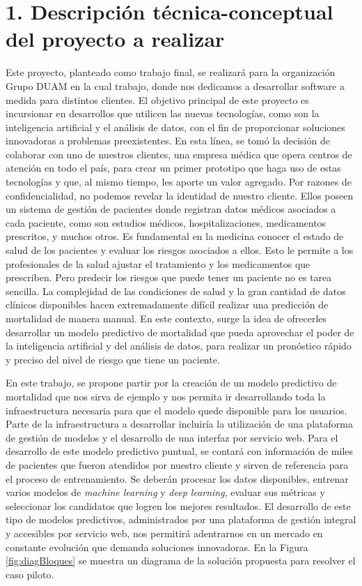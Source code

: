 \documentclass[
11pt, %
]{charter}
\begin{document}
\section{1. Descripción técnica-conceptual del proyecto a realizar}
\label{sec:descripcion}

Este proyecto, planteado como trabajo final, se realizará para la organización Grupo DUAM en la cual trabajo, donde nos dedicamos a desarrollar software a medida para distintos clientes.
El objetivo principal de este proyecto es incursionar en desarrollos que utilicen las nuevas tecnologías, como son la inteligencia artificial y el análisis de datos, con el fin de proporcionar soluciones innovadoras a problemas preexistentes.
En esta línea, se tomó la decisión de colaborar con uno de nuestros clientes, una empresa médica que opera centros de atención en todo el país, para crear un primer prototipo que haga uso de estas tecnologías y que, al mismo tiempo, les aporte un valor agregado. Por razones de confidencialidad, no podemos revelar la identidad de nuestro cliente. Ellos poseen un sistema de gestión de pacientes donde registran datos médicos asociados a cada paciente, como son estudios médicos, hospitalizaciones, medicamentos prescritos, y muchos otros. Es fundamental en la medicina conocer el estado de salud de los pacientes y evaluar los riesgos asociados a ellos. Esto le permite a los profesionales de la salud ajustar el tratamiento y los medicamentos que  prescriben. Pero predecir los riesgos que puede tener un paciente no es tarea sencilla. La complejidad de las condiciones de salud y la gran cantidad de datos clínicos disponibles hacen extremadamente difícil realizar una predicción de mortalidad de manera manual.
En este contexto, surge la idea de ofrecerles desarrollar un modelo predictivo de mortalidad que pueda aprovechar el poder de la inteligencia artificial y del análisis de datos, para realizar un pronóstico rápido y preciso del nivel de riesgo que tiene un paciente.

En este trabajo, se propone partir por la creación de un modelo predictivo de mortalidad que nos sirva de ejemplo y nos permita ir desarrollando toda la infraestructura necesaria para que el modelo quede disponible para los usuarios. Parte de la infraestructura a desarrollar incluiría la utilización de una plataforma de gestión de modelos y el desarrollo de una interfaz por servicio web. Para el desarrollo de este modelo predictivo puntual, se contará con información de miles de pacientes que fueron atendidos por nuestro cliente y sirven de referencia para el proceso de entrenamiento. Se deberán procesar los datos disponibles, entrenar varios modelos de \textit{machine learning} y \textit{deep learning}, evaluar sus métricas y seleccionar los candidatos que logren los mejores resultados.
El desarrollo de este tipo de modelos predictivos, administrados por una plataforma de gestión integral y accesibles por servicio web, nos permitirá adentrarnos en un mercado en constante evolución que demanda soluciones innovadoras. En la Figura \ref{fig:diagBloques} se muestra un diagrama de la solución propuesta para resolver el caso piloto.
\end{document}
